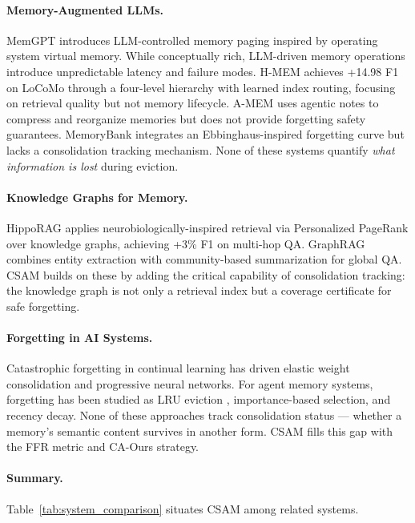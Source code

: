 \documentclass{article}
\begin{document}
\paragraph{Memory-Augmented LLMs.}
MemGPT \citep{memgpt2024} introduces LLM-controlled memory paging inspired
by operating system virtual memory.  While conceptually rich, LLM-driven
memory operations introduce unpredictable latency and failure modes.
H-MEM \citep{hmem2025} achieves +14.98 F1 on LoCoMo through a four-level
hierarchy with learned index routing, focusing on retrieval quality but not
memory lifecycle.  A-MEM \citep{amem2024} uses agentic notes to compress and
reorganize memories but does not provide forgetting safety guarantees.
MemoryBank \citep{zhong2024memorybank} integrates an Ebbinghaus-inspired
forgetting curve but lacks a consolidation tracking mechanism.
None of these systems quantify \emph{what information is lost} during eviction.

\paragraph{Knowledge Graphs for Memory.}
HippoRAG \citep{gutierrez2024hipporag} applies neurobiologically-inspired
retrieval via Personalized PageRank over knowledge graphs, achieving +3\% F1
on multi-hop QA.  GraphRAG \citep{edge2024graphrag} combines entity extraction
with community-based summarization for global QA.  CSAM builds on these by
adding the critical capability of consolidation tracking: the knowledge graph
is not only a retrieval index but a coverage certificate for safe forgetting.

\paragraph{Forgetting in AI Systems.}
Catastrophic forgetting in continual learning \citep{mccloskey1989catastrophic}
has driven elastic weight consolidation \citep{kirkpatrick2017overcoming} and
progressive neural networks.  For agent memory systems, forgetting has been
studied as LRU eviction \citep{tulving1972episodic}, importance-based
selection, and recency decay.  None of these approaches track consolidation
status — whether a memory's semantic content survives in another form.  CSAM
fills this gap with the FFR metric and CA-Ours strategy.

\paragraph{Summary.}
Table~\ref{tab:system_comparison} situates CSAM among related systems.
\end{document}
